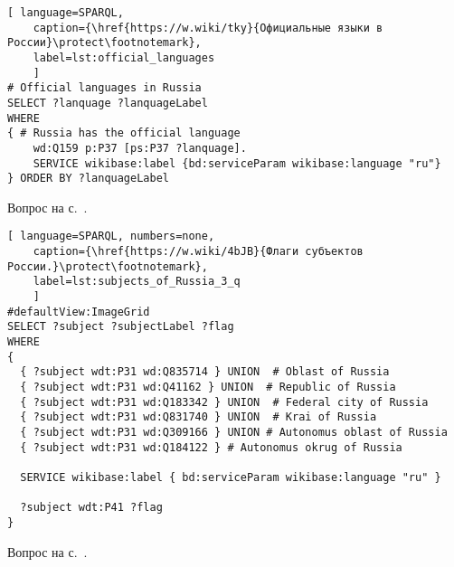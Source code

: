 \begin{task}
	\label{answer:official_language}
	
	\begin{lstlisting}[ language=SPARQL, 
	caption={\href{https://w.wiki/tky}{Официальные языки в России}\protect\footnotemark},
	label=lst:official_languages
	]
# Official languages in Russia
SELECT ?lanquage ?lanquageLabel
WHERE
{ # Russia has the official language
	wd:Q159 p:P37 [ps:P37 ?lanquage].
	SERVICE wikibase:label {bd:serviceParam wikibase:language "ru"}
} ORDER BY ?lanquageLabel
	\end{lstlisting}
	
	\small{Вопрос на с.~\pageref{lst:List_of_historical_countries}.}
\end{task}


\begin{task}
	\label{answer:subjects_of_Russia_3}
	
	\begin{lstlisting}[ language=SPARQL, numbers=none,
	caption={\href{https://w.wiki/4bJB}{Флаги субъектов России.}\protect\footnotemark},
	label=lst:subjects_of_Russia_3_q
	]
#defaultView:ImageGrid
SELECT ?subject ?subjectLabel ?flag
WHERE
{
  { ?subject wdt:P31 wd:Q835714 } UNION  # Oblast of Russia
  { ?subject wdt:P31 wd:Q41162 } UNION  # Republic of Russia
  { ?subject wdt:P31 wd:Q183342 } UNION  # Federal city of Russia
  { ?subject wdt:P31 wd:Q831740 } UNION  # Krai of Russia
  { ?subject wdt:P31 wd:Q309166 } UNION # Autonomus oblast of Russia
  { ?subject wdt:P31 wd:Q184122 } # Autonomus okrug of Russia
  
  SERVICE wikibase:label { bd:serviceParam wikibase:language "ru" }
   
  ?subject wdt:P41 ?flag
}
\end{lstlisting}
	
\small{Вопрос на с.~\pageref{lst:oblast-of-Russia}.}
\end{task}

